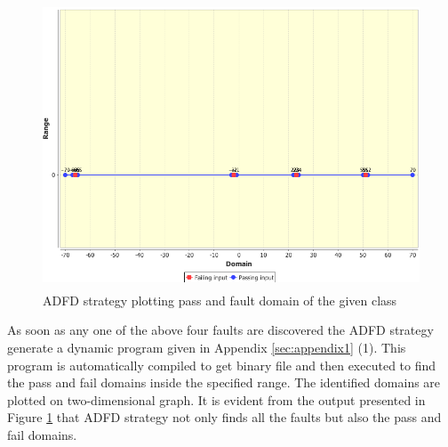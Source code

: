 \begin{figure}[H]
\centering
\includegraphics[width=12.2cm,height=8.5cm]{chapter5/pointDomainOneArgument.png}
\caption{ADFD strategy plotting pass and fault domain of the given class}
\label{fig:ADFD-example}
\end{figure}

As soon as any one of the above four faults are discovered the ADFD strategy generate a dynamic program given in Appendix \ref{sec:appendix1} (1). This program is automatically compiled to get binary file and then executed to find the pass and fail domains inside the specified range. The identified domains are plotted on two-dimensional graph. It is evident from the output presented in Figure \ref{fig:ADFD-example} that ADFD strategy not only finds all the faults but also the pass and fail domains.



